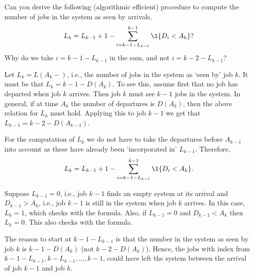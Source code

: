 \begin{question} Can you derive the following (algorithmic efficient) procedure to
    compute the number of jobs in the system as seen by arrivals,
  \begin{equation*}
    L_k = L_{k-1}+1 - \sum_{i= k-1 - L_{k-1}}^{k-1} \1{D_i< A_k}?
  \end{equation*} Why do we take $i=k-1-L_{k-1}$ in  the sum, and not $i=k-2-L_{k-1}$?

\begin{solution}
  Let $L_{k} = L(A_{k}-)$, i.e., the number of jobs in the system as
  `seen by' job $k$. It must be that $L_{k}=k-1 - D(A_{k})$. To see
  this, assume first that no job has departed when job $k$
  arrives. Then job $k$ must see $k-1$ jobs in the system. In general,
  if at time $A_k$ the number of departures is $D(A_k)$, then the
  above relation for $L_k$ must hold. Applying this to job $k-1$ we get that $L_{k-1} = k-2 - D(A_{k-1})$. 

  For the computation of $L_k$ we do not have to take the departures
  before $A_{k-1}$ into account as these have already been
  `incorporated in' $L_{k-1}$.  Therefore,
  \begin{equation*}
    L_k = L_{k-1} + 1 - \sum_{i= k-1 - L_{k-1}}^{k-1} \1{D_i< A_k}.
  \end{equation*}

    Suppose $L_{k-1}=0$, i.e., job $k-1$ finds an empty system at its
    arrival and $D_{k-1}>A_{k}$, i.e., job $k-1$ is still in the
    system when job $k$ arrives. In this case, $L_{k}=1$, which checks
    with the formula.  Also, if $L_{k-1}=0$ and $D_{k-1}< A_k$ then
    $L_k = 0$. This also checks with the formula. 

    The reason to start at $k-1-L_{k-1}$ is that the number in the
    system as seen by job $k$ is $k-1 - D(A_k)$ (not
    $k-2-D(A_k)$). Hence, the jobs with index from
    $k-1-L_{k-1}, k-L_{k-1}, \ldots, k-1$, could have left the system
    between the arrival of job $k-1$ and job $k$.

\end{solution}
\end{question}


